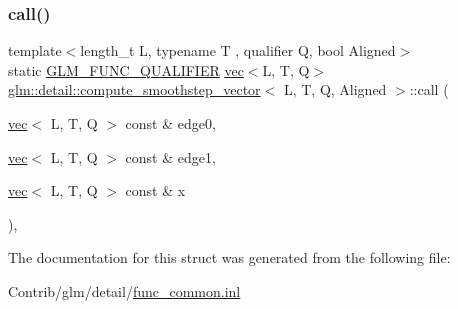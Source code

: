 \subsubsection{\texorpdfstring{call()}{call()}}
{\footnotesize\ttfamily template$<$length\+\_\+t L, typename T , qualifier Q, bool Aligned$>$ \\
static \mbox{\hyperlink{setup_8hpp_a33fdea6f91c5f834105f7415e2a64407}{G\+L\+M\+\_\+\+F\+U\+N\+C\+\_\+\+Q\+U\+A\+L\+I\+F\+I\+ER}} \mbox{\hyperlink{structglm_1_1vec}{vec}}$<$L, T, Q$>$ \mbox{\hyperlink{structglm_1_1detail_1_1compute__smoothstep__vector}{glm\+::detail\+::compute\+\_\+smoothstep\+\_\+vector}}$<$ L, T, Q, Aligned $>$\+::call (\begin{DoxyParamCaption}\item[{\mbox{\hyperlink{structglm_1_1vec}{vec}}$<$ L, T, Q $>$ const \&}]{edge0,  }\item[{\mbox{\hyperlink{structglm_1_1vec}{vec}}$<$ L, T, Q $>$ const \&}]{edge1,  }\item[{\mbox{\hyperlink{structglm_1_1vec}{vec}}$<$ L, T, Q $>$ const \&}]{x }\end{DoxyParamCaption})\hspace{0.3cm}{\ttfamily [inline]}, {\ttfamily [static]}}



The documentation for this struct was generated from the following file\+:\begin{DoxyCompactItemize}
\item 
Contrib/glm/detail/\mbox{\hyperlink{func__common_8inl}{func\+\_\+common.\+inl}}\end{DoxyCompactItemize}
